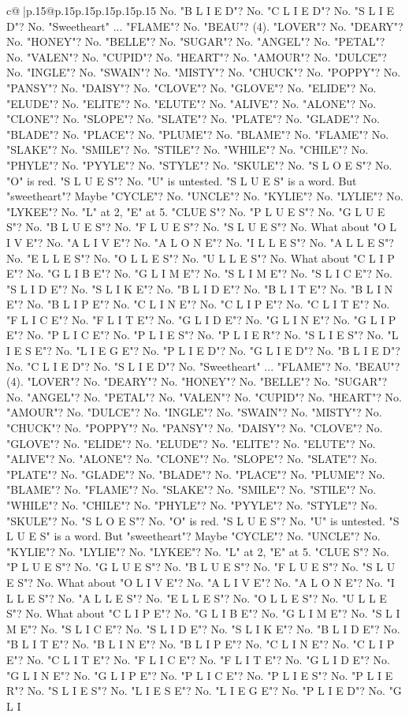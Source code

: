 \documentclass{article}
\begin{document}
{\begin{supertabular}{c@{$\;$}|p{.15\linewidth}@{}p{.15\linewidth}p{.15\linewidth}p{.15\linewidth}p{.15\linewidth}p{.15\linewidth}}
{{{No. "B L I E D"? No. "C L I E D"? No. "S L I E D"? No. "Sweetheart" ... "FLAME"? No. "BEAU"? (4). "LOVER"? No. "DEARY"? No. "HONEY"? No. "BELLE"? No. "SUGAR"? No. "ANGEL"? No. "PETAL"? No. "VALEN"? No. "CUPID"? No. "HEART"? No. "AMOUR"? No. "DULCE"? No. "INGLE"? No. "SWAIN"? No. "MISTY"? No. "CHUCK"? No. "POPPY"? No. "PANSY"? No. "DAISY"? No. "CLOVE"? No. "GLOVE"? No. "ELIDE"? No. "ELUDE"? No. "ELITE"? No. "ELUTE"? No. "ALIVE"? No. "ALONE"? No. "CLONE"? No. "SLOPE"? No. "SLATE"? No. "PLATE"? No. "GLADE"? No. "BLADE"? No. "PLACE"? No. "PLUME"? No. "BLAME"? No. "FLAME"? No. "SLAKE"? No. "SMILE"? No. "STILE"? No. "WHILE"? No. "CHILE"? No. "PHYLE"? No. "PYYLE"? No. "STYLE"? No. "SKULE"? No. "S L O E S"? No. "O" is red. "S L U E S"? No. "U" is untested. "S L U E S" is a word. But "sweetheart"? Maybe "CYCLE"? No. "UNCLE"? No. "KYLIE"? No. "LYLIE"? No. "LYKEE"? No. "L" at 2, "E" at 5. "CLUE S"? No. "P L U E S"? No. "G L U E S"? No. "B L U E S"? No. "F L U E S"? No. "S L U E S"? No. What about "O L I V E"? No. "A L I V E"? No. "A L O N E"? No. "I L L E S"? No. "A L L E S"? No. "E L L E S"? No. "O L L E S"? No. "U L L E S"? No. What about "C L I P E"? No. "G L I B E"? No. "G L I M E"? No. "S L I M E"? No. "S L I C E"? No. "S L I D E"? No. "S L I K E"? No. "B L I D E"? No. "B L I T E"? No. "B L I N E"? No. "B L I P E"? No. "C L I N E"? No. "C L I P E"? No. "C L I T E"? No. "F L I C E"? No. "F L I T E"? No. "G L I D E"? No. "G L I N E"? No. "G L I P E"? No. "P L I C E"? No. "P L I E S"? No. "P L I E R"? No. "S L I E S"? No. "L I E S E"? No. "L I E G E"? No. "P L I E D"? No. "G L I E D"? No. "B L I E D"? No. "C L I E D"? No. "S L I E D"? No. "Sweetheart" ... "FLAME"? No. "BEAU"? (4). "LOVER"? No. "DEARY"? No. "HONEY"? No. "BELLE"? No. "SUGAR"? No. "ANGEL"? No. "PETAL"? No. "VALEN"? No. "CUPID"? No. "HEART"? No. "AMOUR"? No. "DULCE"? No. "INGLE"? No. "SWAIN"? No. "MISTY"? No. "CHUCK"? No. "POPPY"? No. "PANSY"? No. "DAISY"? No. "CLOVE"? No. "GLOVE"? No. "ELIDE"? No. "ELUDE"? No. "ELITE"? No. "ELUTE"? No. "ALIVE"? No. "ALONE"? No. "CLONE"? No. "SLOPE"? No. "SLATE"? No. "PLATE"? No. "GLADE"? No. "BLADE"? No. "PLACE"? No. "PLUME"? No. "BLAME"? No. "FLAME"? No. "SLAKE"? No. "SMILE"? No. "STILE"? No. "WHILE"? No. "CHILE"? No. "PHYLE"? No. "PYYLE"? No. "STYLE"? No. "SKULE"? No. "S L O E S"? No. "O" is red. "S L U E S"? No. "U" is untested. "S L U E S" is a word. But "sweetheart"? Maybe "CYCLE"? No. "UNCLE"? No. "KYLIE"? No. "LYLIE"? No. "LYKEE"? No. "L" at 2, "E" at 5. "CLUE S"? No. "P L U E S"? No. "G L U E S"? No. "B L U E S"? No. "F L U E S"? No. "S L U E S"? No. What about "O L I V E"? No. "A L I V E"? No. "A L O N E"? No. "I L L E S"? No. "A L L E S"? No. "E L L E S"? No. "O L L E S"? No. "U L L E S"? No. What about "C L I P E"? No. "G L I B E"? No. "G L I M E"? No. "S L I M E"? No. "S L I C E"? No. "S L I D E"? No. "S L I K E"? No. "B L I D E"? No. "B L I T E"? No. "B L I N E"? No. "B L I P E"? No. "C L I N E"? No. "C L I P E"? No. "C L I T E"? No. "F L I C E"? No. "F L I T E"? No. "G L I D E"? No. "G L I N E"? No. "G L I P E"? No. "P L I C E"? No. "P L I E S"? No. "P L I E R"? No. "S L I E S"? No. "L I E S E"? No. "L I E G E"? No. "P L I E D"? No. "G L I }}}
\end{supertabular}}
\end{document}
